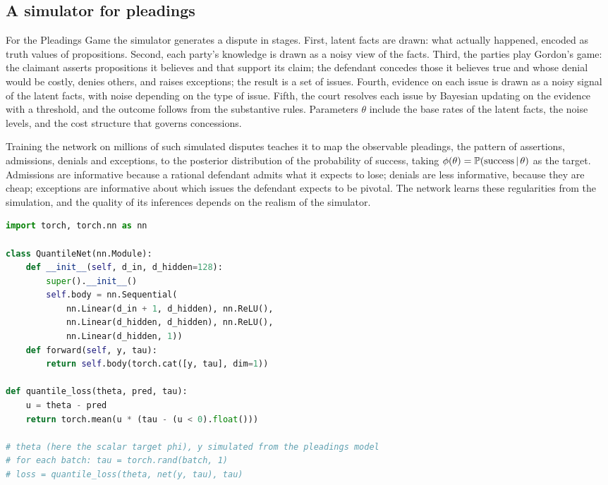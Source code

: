 \subsection{A simulator for pleadings}

For the Pleadings Game the simulator generates a dispute in stages. First, latent facts are drawn: what actually happened, encoded as truth values of propositions. Second, each party's knowledge is drawn as a noisy view of the facts. Third, the parties play Gordon's game: the claimant asserts propositions it believes and that support its claim; the defendant concedes those it believes true and whose denial would be costly, denies others, and raises exceptions; the result is a set of issues. Fourth, evidence on each issue is drawn as a noisy signal of the latent facts, with noise depending on the type of issue. Fifth, the court resolves each issue by Bayesian updating on the evidence with a threshold, and the outcome follows from the substantive rules. Parameters $\theta$ include the base rates of the latent facts, the noise levels, and the cost structure that governs concessions.

Training the network on millions of such simulated disputes teaches it to map the observable pleadings, the pattern of assertions, admissions, denials and exceptions, to the posterior distribution of the probability of success, taking $\phi(\theta)=\mathbb{P}(\text{success}\,\vert\,\theta)$ as the target. Admissions are informative because a rational defendant admits what it expects to lose; denials are less informative, because they are cheap; exceptions are informative about which issues the defendant expects to be pivotal. The network learns these regularities from the simulation, and the quality of its inferences depends on the realism of the simulator.

\begin{lstlisting}[language=Python, caption={A sketch of the quantile network for pleadings (the simulator and training loop are omitted).}]
import torch, torch.nn as nn

class QuantileNet(nn.Module):
    def __init__(self, d_in, d_hidden=128):
        super().__init__()
        self.body = nn.Sequential(
            nn.Linear(d_in + 1, d_hidden), nn.ReLU(),
            nn.Linear(d_hidden, d_hidden), nn.ReLU(),
            nn.Linear(d_hidden, 1))
    def forward(self, y, tau):
        return self.body(torch.cat([y, tau], dim=1))

def quantile_loss(theta, pred, tau):
    u = theta - pred
    return torch.mean(u * (tau - (u < 0).float()))

# theta (here the scalar target phi), y simulated from the pleadings model
# for each batch: tau = torch.rand(batch, 1)
# loss = quantile_loss(theta, net(y, tau), tau)
\end{lstlisting}

